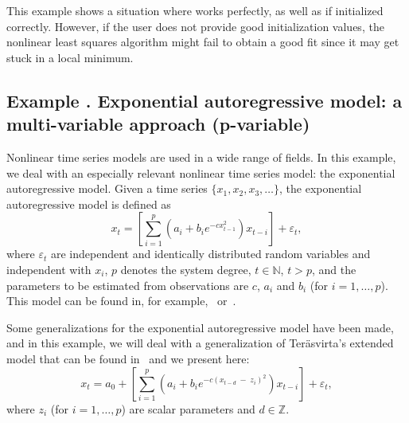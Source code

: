 This example shows a situation where  works perfectly, as well as  if initialized correctly. However, if the user does not provide good initialization values, the nonlinear least squares algorithm might fail to obtain a good fit since it may get stuck in a local minimum.
 
\addtocounter{n}{1}
\subsection{Example . Exponential autoregressive model: a multi-variable approach (p-variable)}\label{ss_autorregressive}
Nonlinear time series models are used in a wide range of fields. In this example, we deal with an especially relevant nonlinear time series model: the exponential autoregressive model. Given a time series $\{ x_1,x_2, x_3,\ldots \}$, the exponential autoregressive model is defined as
\begin{equation*}
 x_t= \left[ \sum_{i=1}^p \left(a_i + b_i e^{-cx_{t-1}^2}\right)x_{t-i} \right] + \varepsilon_t,
\end{equation*}
where $\varepsilon_t$ are independent and identically distributed random variables and independent with $x_i$, $p$ denotes the system degree, $t \in \mathbb{N}$, $t>p$, and the parameters to be estimated from observations are $c$, $a_i$ and $b_i$ (for $i=1,\ldots,p$). This model can be found in, for example,~\citet{example_xu_modeling_a_nonlinear} or~\citet{example_chen_generalized_exponential_autoregressive}.


Some generalizations for the exponential autoregressive model have been made, and in this example, we will deal with a generalization of Teräsvirta’s extended model that can be found in~\citet[equation (10)]{example_chen_generalized_exponential_autoregressive} and we present here:
\begin{equation}\label{eq:ExpAR_Terasvirta_generalization}
 x_t= a_0 + \left[ \sum_{i=1}^p \left(a_i + b_i e^{-c (x_{t-d} \; - \; z_i)^2}\right)x_{t-i} \right] + \varepsilon_t,
\end{equation}
where $z_i$ (for $i=1,\ldots,p$) are scalar parameters and $d \in \mathbb{Z}$.  

